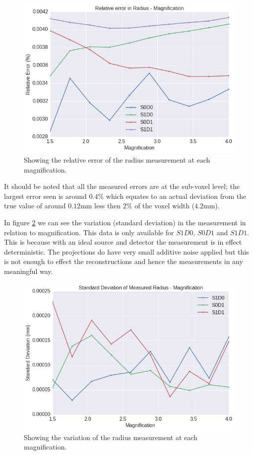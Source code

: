 \documentclass[
  twoside,
  11pt, a4paper,
  footinclude=true,
  headinclude=true,
  cleardoublepage=empty
]{scrbook}
\begin{document}
\begin{figure}[h!]
  \centering
    \includegraphics[width=\textwidth]{figures/output_8_0.png}
    \caption{Showing the relative error of the radius measurement at each magnification.}
        \label{relerrormeasuredradius}
\end{figure}

It should be noted that all the measured errors are at the sub-voxel level; the largest error seen is around $0.4\%$ which equates to an actual deviation from the true value of around $0.12$mm less then $2\%$ of the voxel width ($4.2$mm).

In figure \ref{stdmeasuredradius} we can see the variation (standard deviation) in the measurement in relation to magnification. This data is only available for $S1D0$, $S0D1$ and $S1D1$. This is because with an ideal source and detector the measurement is in effect deterministic. The projections do have very small additive noise applied but this is not enough to effect the reconstructions and hence the measurements in any meaningful way.

\begin{figure}[h!]
  \centering
    \includegraphics[width=\textwidth]{figures/output_14_0.png}
    \caption{Showing the variation of the radius measurement at each magnification.}
        \label{stdmeasuredradius}
\end{figure}
\end{document}
